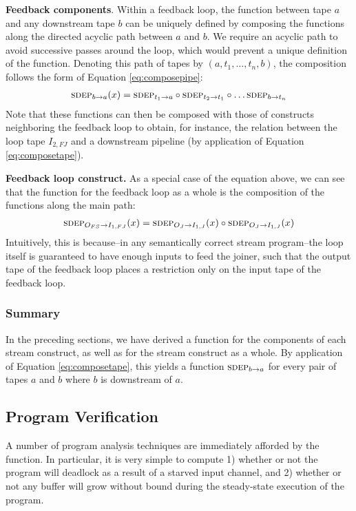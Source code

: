 {\bf Feedback components}.  Within a feedback loop, the \sdep function
between tape $a$ and any downstream tape $b$ can be uniquely defined
by composing the \sdep functions along the directed acyclic path
between $a$ and $b$.  We require an acyclic path to avoid successive
passes around the loop, which would prevent a unique definition of the
function.  Denoting this path of tapes by $(a, t_1, \dots , t_n, b)$,
the composition follows the form of Equation \ref{eq:composepipe}:
\begin{align*}
\mi{a}{b}(x) = \mi{a}{t_1} \circ \mi{t_1}{t_2} \circ \dots \mi{t_n}{b}
\end{align*}
Note that these functions can then be composed with those of
constructs neighboring the feedback loop to obtain, for instance, the
relation between the loop tape $I_{2,FJ}$ and a downstream pipeline (by
application of Equation \ref{eq:composetape}).

{\bf Feedback loop construct.}  As a special case of the equation
above, we can see that the \sdep function for the feedback loop as a
whole is the composition of the \sdep functions along the main path:
\begin{align*}
\mi{I_{1,FJ}}{O_{FS}}(x) = \mi{I_{1,J}}{O_J}(x) \circ \mi{I_{1,J}}{O_J}(x) 
\end{align*}
Intuitively, this is because--in any semantically correct stream
program--the loop itself is guaranteed to have enough inputs to feed
the joiner, such that the output tape of the feedback loop places a
restriction only on the input tape of the feedback loop.

\subsubsection{Summary}

In the preceding sections, we have derived a \sdep function for the
components of each stream construct, as well as for the stream
construct as a whole.  By application of Equation
\ref{eq:composetape}, this yields a function $\mi{a}{b}$ for every
pair of tapes $a$ and $b$ where $b$ is downstream of $a$.

\subsection{Program Verification}
\label{sec:prog-verif}

A number of program analysis techniques are immediately afforded by
the \sdep function.  In particular, it is very simple to compute 1)
whether or not the program will deadlock as a result of a starved
input channel, and 2) whether or not any buffer will grow without
bound during the steady-state execution of the program.

